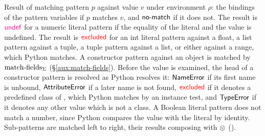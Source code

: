 Result of matching pattern $p$ against value $v$ under environment $\rho$: the bindings of the pattern
variables if $p$ matches $v$, and $\mathsf{no}\text{-}\mathsf{match}$ if it does not. The result is $\textcolor{magenta}{\mathsf{undef}}$ for a numeric literal pattern if the equality of the literal and the value is undefined. The result is $\textcolor{red}{\mathsf{excluded}}$ for an int literal pattern against a float, a list pattern against a tuple, a tuple pattern against a list, or either against a range, which Python matches. A constructor pattern against an object is matched by $\mathrm{match\text{-}fields}_{\Sigma}$ (\S\ref{aux:match-fields}). Before the value is examined, the head of a constructor pattern is resolved as Python resolves it: $\mathsf{NameError}$ if its first name is unbound, $\mathsf{AttributeError}$ if a later name is not found, $\textcolor{red}{\mathsf{excluded}}$ if it denotes a predefined class of , which Python matches by an instance test, and $\mathsf{TypeError}$ if it denotes any other value which is not a class. A Boolean literal pattern does not match a number, since Python compares the value with the literal by identity. Sub-patterns are matched left to right, their results composing with $\otimes$
().